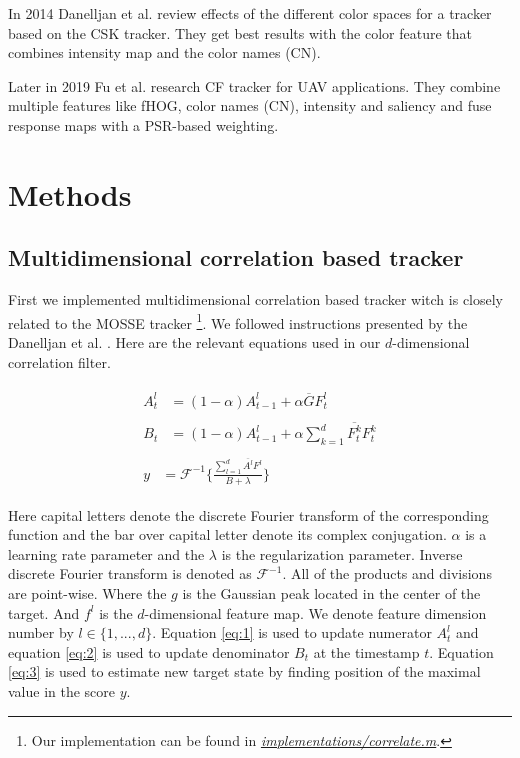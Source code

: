 \documentclass[runningheads]{llncs}
\begin{document}
In 2014 Danelljan et al. \cite{danelljan2014adaptive} review effects of the different color spaces for a tracker based on the CSK tracker. They get best results with the color feature that combines intensity map and the color names (CN).

Later in 2019 Fu et al. \cite{fu2019correlation} research CF tracker for UAV applications. They combine multiple features like fHOG, color names (CN), intensity and saliency and fuse response maps with a PSR-based weighting. 

\section{Methods}
\label{sec:methods}

\subsection{Multidimensional correlation based tracker}

First we implemented multidimensional correlation based tracker witch is closely related to the MOSSE tracker \footnote{Our implementation can be found in \href{https://github.com/matjazmav/fri-1819-nmrv-seminar/blob/master/implementations/correlate.m}{\textit{implementations/\-correlate.m}}.}. We followed instructions presented by the Danelljan et al. \cite{danelljan2014accurate}. Here are the relevant equations used in our $d$-dimensional correlation filter.

\begin{align}
\begin{split}
A_t^l &= (1 - \alpha) A_{t-1}^l + \alpha \overline{G} F_t^l
\label{eq:1}
\end{split}\\
\begin{split}
B_t &= (1 - \alpha) A_{t-1}^l + \alpha \sum_{k=1}^d \overline{F_t^k} F_t^k
\label{eq:2}
\end{split}\\
\begin{split}
y &= \mathcal{F}^{-1} \{ \frac{\sum_{l=1}^d \overline{A^l} F^l}{B + \lambda} \}
\label{eq:3}
\end{split}
\end{align}

Here capital letters denote the discrete Fourier transform of the corresponding function and the bar over capital letter denote its complex conjugation. $\alpha$ is a learning rate parameter and the $\lambda$ is the regularization parameter. Inverse discrete Fourier transform is denoted as $\mathcal{F}^{-1}$. All of the products and divisions are point-wise. Where the $g$ is the Gaussian peak located in the center of the target. And $f^l$ is the $d$-dimensional feature map. We denote feature dimension number by $l \in \{1,...,d\}$. Equation \ref{eq:1} is used to update numerator $A_t^l$ and equation \ref{eq:2} is used to update denominator $B_t$ at the timestamp $t$. Equation \ref{eq:3} is used to estimate new target state by finding position of the maximal value in the score $y$.
\end{document}
